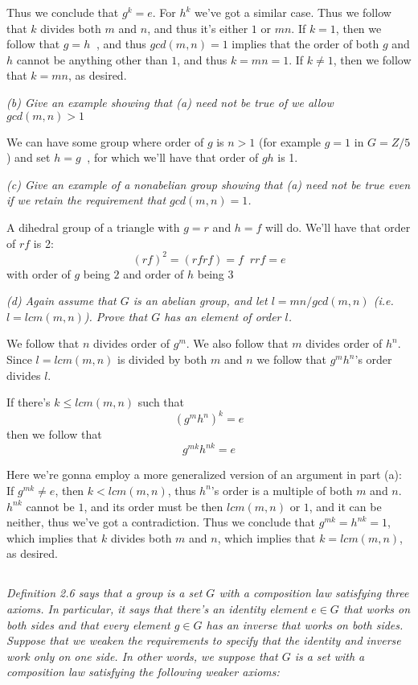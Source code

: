 \documentclass[11pt,oneside,titlepage]{book}
\DeclareMathOperator \inv {^{-1}}
\begin{document}
Thus we conclude that $g^k = e$. For $h^k$ we've got a similar
case. Thus we follow that $k$ divides both $m$ and $n$, and thus it's
either $1$ or $mn$. If $k = 1$, then we follow that $g = h\inv$, and
thus $gcd(m, n) = 1$ implies that the order of both $g$ and $h$ cannot
be anything other than $1$, and thus $k = mn = 1$.  If $k \neq 1$,
then we follow that $k = mn$, as desired.

\textit{(b) Give an example showing that (a) need not be true of we
allow $gcd(m, n) > 1$}

We can have some group where order of $g$ is $n > 1$ (for example $g =
1$ in $G = Z/5$) and set $h = g\inv$, for which we'll have that order
of $gh$ is 1.

\textit{(c) Give an example of a nonabelian group showing that (a)
need not be true even if we retain the requirement that $gcd(m, n) =
1$.}

A dihedral group of a triangle with $g = r$ and $h = f$ will do. We'll
have that order of $rf$ is 2:
$$(rf)^2 = (rfrf) = f\inv r r f = e$$
with order of $g$ being $2$ and order of $h$ being $3$

\textit{(d) Again assume that $G$ is an abelian group, and let $l = mn
/ gcd(m, n)$ (i.e.  $l = lcm(m, n)$). Prove that $G$ has an element of
order $l$.}

We follow that $n$ divides order of $g^m$. We also follow that $m$
divides order of $h^n$.  Since $l = lcm(m, n)$ is divided by both $m$
and $n$ we follow that $g^m h^n$'s order divides $l$.

If there's $k \leq lcm(m, n)$ such that
$$(g^m h^n)^k = e$$
then we follow that
$$g^{mk} h^{nk} = e$$

Here we're gonna employ a more generalized version of an argument in
part (a): If $g^{mk} \neq e$, then $k < lcm(m, n)$, thus $h^{n}$'s
order is a multiple of both $m$ and $n$. $h^{nk}$ cannot be $1$, and
its order must be then $lcm(m, n)$ or $1$, and it can be neither, thus
we've got a contradiction. Thus we conclude that $g^{mk} = h^{nk} =
1$, which implies that $k$ divides both $m$ and $n$, which implies
that $k = lcm(m, n)$, as desired.

\subsection{}

\textit{Definition 2.6 says that a group is a set $G$ with a
composition law satisfying three axioms.  In particular, it says that
there's an identity element $e \in G$ that works on both sides and
that every element $g \in G$ has an inverse that works on both
sides. Suppose that we weaken the requirements to specify that the
identity and inverse work only on one side. In other words, we suppose
that $G$ is a set with a composition law satisfying the following
weaker axioms: }
\end{document}
